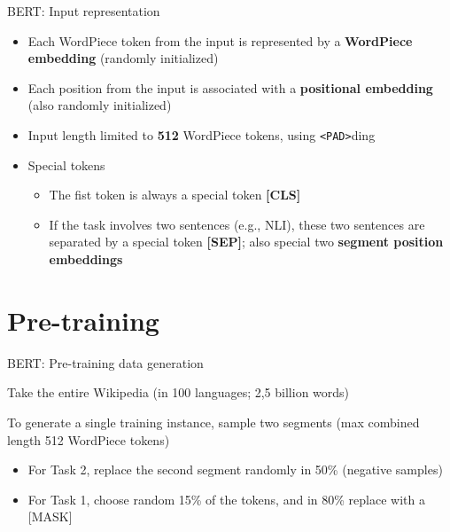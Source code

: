 \documentclass[12pt,aspectratio=169,handout]{beamer}
\begin{document}
\begin{frame}{BERT: Input representation}
	
	\begin{itemize}
		\item Each WordPiece token from the input is represented by a \textbf{WordPiece embedding} (randomly initialized)
		\item Each position from the input is associated with a \textbf{positional embedding} (also randomly initialized)
		\item Input length limited to \textbf{512} WordPiece tokens, using \texttt{<PAD>}ding
		\item Special tokens
		\begin{itemize}
			\item The fist token is always a special token \textbf{[CLS]}
			\item If the task involves two sentences (e.g., NLI), these two sentences are separated by a special token \textbf{[SEP]}; also special two \textbf{segment position embeddings} 
		\end{itemize}
		
	\end{itemize}
	
\end{frame}


\section{Pre-training}





\begin{frame}{BERT: Pre-training data generation}
	
	Take the entire Wikipedia (in 100 languages; 2,5 billion words)
	
	To generate a single training instance, sample two segments (max combined length 512 WordPiece tokens)
	
	\begin{itemize}
		\item For Task 2, replace the second segment randomly in 50\% (negative samples)
		\item For Task 1, choose random 15\% of the tokens, and in 80\% replace with a [MASK] 
	\end{itemize}
	
	
\end{frame}
\end{document}
